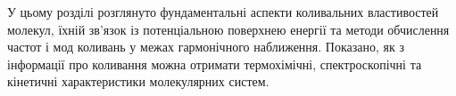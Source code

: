 

%





У цьому розділі розглянуто фундаментальні аспекти коливальних властивостей молекул,
їхній зв’язок із потенціальною поверхнею енергії та методи обчислення частот і мод коливань
у межах гармонічного наближення.
Показано, як з інформації про коливання можна отримати термохімічні, спектроскопічні
та кінетичні характеристики молекулярних систем.

